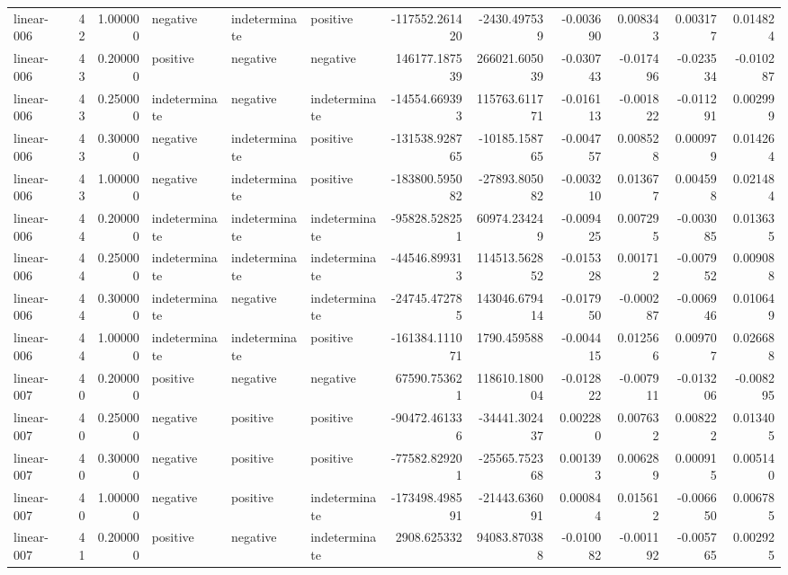 \begin{tabular}{lrrlllrrrrrr}
linear-006 & 42 & 1.000000 & negative & indeterminate & positive & -117552.261420 & -2430.497539 & -0.003690 & 0.008343 & 0.003177 & 0.014824 \\
linear-006 & 43 & 0.200000 & positive & negative & negative & 146177.187539 & 266021.605039 & -0.030743 & -0.017496 & -0.023534 & -0.010287 \\
linear-006 & 43 & 0.250000 & indeterminate & negative & indeterminate & -14554.669393 & 115763.611771 & -0.016113 & -0.001822 & -0.011291 & 0.002999 \\
linear-006 & 43 & 0.300000 & negative & indeterminate & positive & -131538.928765 & -10185.158765 & -0.004757 & 0.008528 & 0.000979 & 0.014264 \\
linear-006 & 43 & 1.000000 & negative & indeterminate & positive & -183800.595082 & -27893.805082 & -0.003210 & 0.013677 & 0.004598 & 0.021484 \\
linear-006 & 44 & 0.200000 & indeterminate & indeterminate & indeterminate & -95828.528251 & 60974.234249 & -0.009425 & 0.007295 & -0.003085 & 0.013635 \\
linear-006 & 44 & 0.250000 & indeterminate & indeterminate & indeterminate & -44546.899313 & 114513.562852 & -0.015328 & 0.001712 & -0.007952 & 0.009088 \\
linear-006 & 44 & 0.300000 & indeterminate & negative & indeterminate & -24745.472785 & 143046.679414 & -0.017950 & -0.000287 & -0.006946 & 0.010649 \\
linear-006 & 44 & 1.000000 & indeterminate & indeterminate & positive & -161384.111071 & 1790.459588 & -0.004415 & 0.012566 & 0.009707 & 0.026688 \\
linear-007 & 40 & 0.200000 & positive & negative & negative & 67590.753621 & 118610.180004 & -0.012822 & -0.007911 & -0.013206 & -0.008295 \\
linear-007 & 40 & 0.250000 & negative & positive & positive & -90472.461336 & -34441.302437 & 0.002280 & 0.007632 & 0.008222 & 0.013405 \\
linear-007 & 40 & 0.300000 & negative & positive & positive & -77582.829201 & -25565.752368 & 0.001393 & 0.006289 & 0.000915 & 0.005140 \\
linear-007 & 40 & 1.000000 & negative & positive & indeterminate & -173498.498591 & -21443.636091 & 0.000844 & 0.015612 & -0.006650 & 0.006785 \\
linear-007 & 41 & 0.200000 & positive & negative & indeterminate & 2908.625332 & 94083.870388 & -0.010082 & -0.001192 & -0.005765 & 0.002925 \\

\end{tabular}
